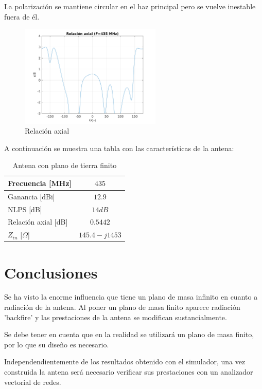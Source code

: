 \documentclass[12pt]{article}
\begin{document}
La polarización se mantiene circular en el haz principal pero se vuelve inestable fuera de él.\\

\begin{figure}[H]
	\centering
	\includegraphics[width=0.6\textwidth]{helix_2_F435_AR.png}
	\caption{Relación axial}
\end{figure}

\newpage
A continuación se muestra una tabla con las características de la antena:

\begin{table}[!h]
	\centering
	\begin{tabular}{lc}
		\hline 
		Frecuencia [MHz] & $435$ \\ 
		\hline 
		Ganancia [dBi] & $12.9$ \\ 
		\hline 
		NLPS [dB] & $14 dB$ \\ 
		\hline 
		Relación axial [dB] & $0.5442$ \\ 
		\hline 
		$Z_{in}$ [$\Omega$] & $145.4 - j1453$ \\ 
		\hline 
	\end{tabular} 
	\caption{Antena con plano de tierra finito}
\end{table} 

\newpage
\section{Conclusiones}
Se ha visto la enorme influencia que tiene un plano de masa infinito en cuanto a radiación de la antena. Al poner un plano de masa finito aparece radiación 'backfire' y las prestaciones de la antena se modifican sustancialmente. 

Se debe tener en cuenta que en la realidad se utilizará un plano de masa finito, por lo que su diseño es necesario.

Independendientemente de los resultados obtenido con el simulador, una vez construida la antena será necesario verificar sus prestaciones con un analizador vectorial de redes. 
\end{document}
